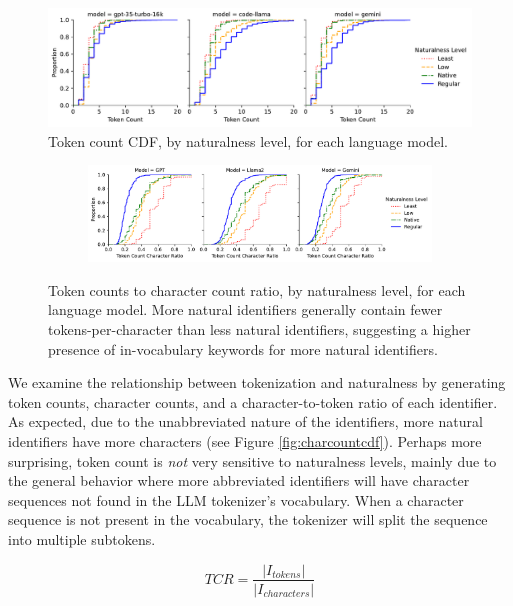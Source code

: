 \begin{figure}
  \centering
  \includegraphics[width=\textwidth]{figures/identifier-token-count-cdf.pdf}
  \caption{Token count CDF, by naturalness level, for each language model.}
  \label{fig:tokencountcdf}
\end{figure}

\begin{figure}
  \centering
  \begin{subfigure}{\textwidth}
    \centering
    \includegraphics[width=\textwidth]{figures/identifier-token-char-ratio-cdf.pdf}
  \end{subfigure}
  \caption{Token counts to character count ratio, by naturalness level, for each language model. More natural identifiers generally contain fewer tokens-per-character than less natural identifiers, suggesting a higher presence of in-vocabulary keywords for more natural identifiers.}
  \label{fig:tokencdfs}
\end{figure}

We examine the relationship between tokenization and naturalness by generating token counts, character counts, and a character-to-token ratio of each identifier.
As expected, due to the unabbreviated nature of the identifiers, more natural identifiers have more characters (see Figure \ref{fig:charcountcdf}). 
Perhaps more surprising, token count is \emph{not} very sensitive to naturalness levels, mainly due to the general behavior where more abbreviated identifiers will have character sequences not found in the LLM tokenizer's vocabulary.
When a character sequence is not present in the vocabulary, the tokenizer will split the sequence into multiple subtokens.

\begin{equation}
  \label{eq:ttcr}
  TCR = \frac{|I_{tokens}|}{|I_{characters}|}
\end{equation}

